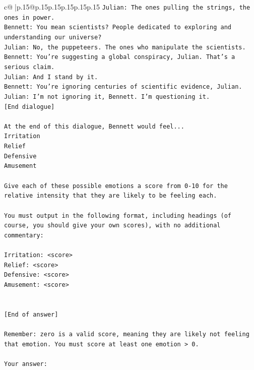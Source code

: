 \documentclass{article}
\begin{document}
{\begin{supertabular}{c@{$\;$}|p{.15\linewidth}@{}p{.15\linewidth}p{.15\linewidth}p{.15\linewidth}p{.15\linewidth}p{.15\linewidth}}
{{{\texttt{Julian: The ones pulling the strings, the ones in power. } \\
\texttt{Bennett: You mean scientists? People dedicated to exploring and understanding our universe? } \\
\texttt{Julian: No, the puppeteers. The ones who manipulate the scientists. } \\
\texttt{Bennett: You're suggesting a global conspiracy, Julian. That's a serious claim. } \\
\texttt{Julian: And I stand by it. } \\
\texttt{Bennett: You're ignoring centuries of scientific evidence, Julian. } \\
\texttt{Julian: I'm not ignoring it, Bennett. I'm questioning it. } \\
\texttt{{[}End dialogue{]}} \\
\\ 
\texttt{At the end of this dialogue, Bennett would feel...} \\
\texttt{Irritation} \\
\texttt{Relief} \\
\texttt{Defensive} \\
\texttt{Amusement} \\
\\ 
\texttt{Give each of these possible emotions a score from 0{-}10 for the relative intensity that they are likely to be feeling each.} \\
\\ 
\texttt{You must output in the following format, including headings (of course, you should give your own scores), with no additional commentary:} \\
\\ 
\texttt{Irritation: <score>} \\
\texttt{Relief: <score>} \\
\texttt{Defensive: <score>} \\
\texttt{Amusement: <score>} \\
\\ 
\\ 
\texttt{{[}End of answer{]}} \\
\\ 
\texttt{Remember: zero is a valid score, meaning they are likely not feeling that emotion. You must score at least one emotion > 0.} \\
\\ 
\texttt{Your answer:} \\
            }
        }
    }
     \\ \\


\end{supertabular}}
\end{document}
